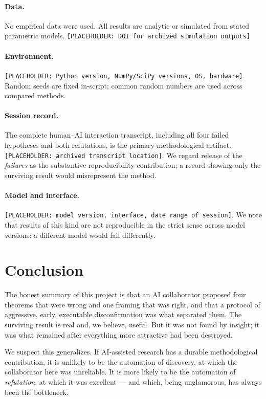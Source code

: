 \documentclass[11pt]{article}
\theoremstyle{remark}
\begin{document}
\paragraph{Data.} No empirical data were used. All results are analytic or simulated from stated parametric models. \texttt{[PLACEHOLDER: DOI for archived simulation outputs]}

\paragraph{Environment.} \texttt{[PLACEHOLDER: Python version, NumPy/SciPy versions, OS, hardware]}. Random seeds are fixed in-script; common random numbers are used across compared methods.

\paragraph{Session record.} The complete human--AI interaction transcript, including all four failed hypotheses and both refutations, is the primary methodological artifact. \texttt{[PLACEHOLDER: archived transcript location]}. We regard release of the \emph{failures} as the substantive reproducibility contribution; a record showing only the surviving result would misrepresent the method.

\paragraph{Model and interface.} \texttt{[PLACEHOLDER: model version, interface, date range of session]}. We note that results of this kind are not reproducible in the strict sense across model versions: a different model would fail differently.

\section{Conclusion}

The honest summary of this project is that an AI collaborator proposed four theorems that were wrong and one framing that was right, and that a protocol of aggressive, early, executable disconfirmation was what separated them. The surviving result is real and, we believe, useful. But it was not found by insight; it was what remained after everything more attractive had been destroyed.

We suspect this generalizes. If AI-assisted research has a durable methodological contribution, it is unlikely to be the automation of discovery, at which the collaborator here was unreliable. It is more likely to be the automation of \emph{refutation}, at which it was excellent --- and which, being unglamorous, has always been the bottleneck.
\end{document}
